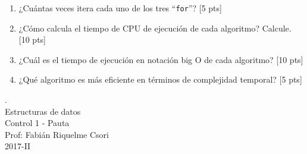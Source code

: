 \documentclass[letter,12pt,oneside]{book}
\theoremstyle{definition}
\begin{document}
\begin{enumerate}
    \begin{enumerate}
        \item ¿Cuántas veces itera cada uno de los tres ``\texttt{for}''? \tabto{77ex} [5 pts]
        \item ¿Cómo calcula el tiempo de CPU de ejecución de cada algoritmo? Calcule. \tabto{76ex} [10 pts]
        \item ¿Cuál es el tiempo de ejecución en notación big O de cada algoritmo? \tabto{76ex} [10 pts]
        \item ¿Qué algoritmo es más eficiente en términos de complejidad temporal? \tabto{77ex} [5 pts]
    \end{enumerate}
\end{enumerate}

\newpage

\begin{center}
 {\Large
  {\color{white}.}\\
  Estructuras de datos\\[1ex]
  Control 1 - Pauta}\\[1.2ex]
  Prof: Fabián Riquelme Csori\\
  2017-II
\end{center}
\end{document}
